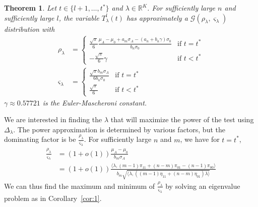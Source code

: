 \documentclass[final]{IEEEtran}
\newtheorem{theorem}{Theorem}
\theoremstyle{definition}
\begin{document}
\begin{theorem}
  \label{thm:8}
  Let $t \in \{l+1, \dots, t^{*}\}$ and $\lambda \in
  \mathbb{R}^{K}$. For sufficiently large $n$ and sufficiently large
  $l$, the variable $T_{\lambda}^{l}(t)$ has approximately a
  $\mathcal{G}(\rho_{\lambda}, \varsigma_{\lambda})$ distribution with
\begin{align}
  \label{eq:13}
  \rho_{\lambda} &= \begin{cases}
    \frac{\sqrt{\pi}}{6} \frac{\mu_A - \mu_0 + a_m\sigma_A - (a_n + b_n
      \gamma)\sigma_0}{b_n \sigma_0} & \text{if $t =
        t^{*}$} \\
      - \frac{ \sqrt{\pi}}{6} \gamma & \text{if $t < t^{*}$}
  \end{cases}\\
  \varsigma_{\lambda} &= \begin{cases}
    \frac{\sqrt{\pi} b_m \sigma_A}{6 b_n \sigma_0} & \text{if $t =
      t^{*}$} \\
    \frac{\sqrt{\pi}}{6} & \text{if $t < t^{*}$}
    \end{cases}
\end{align}
$\gamma \approx 0.57721$ is the Euler-Mascheroni constant.
\end{theorem}
We are interested in finding the $\lambda$ that will maximize the
power of the test using $\Delta_{\lambda}$. The power approximation is
determined by various factors, but the dominating factor is
be $\tfrac{\rho_\lambda}{\varsigma_\lambda}$. For sufficiently large $n$
and $m$, we have for $t = t^{*}$,
\begin{equation*}
  \begin{split}
  \frac{\rho_\lambda}{\varsigma_\lambda} &= (1 + o(1)) \frac{\mu_A - \mu_0}{b_m
    \sigma_A} \\ &= (1 + o(1)) \frac{\langle \lambda, (m-1)\pi_{11} + (n-m)\pi_{01} -
    (n-1) \pi_{00} \rangle}{b_m \sqrt{\langle \lambda, ((m-1) \eta_{11} +
    (n-m)\eta_{01}) \lambda \rangle}}
  \end{split}
\end{equation*}
We can thus find the maximum and minimum of
$\tfrac{\rho_{\lambda}}{\varsigma_{\lambda}}$ by solving an 
eigenvalue problem as in Corollary~\ref{cor:1}.
\end{document}
